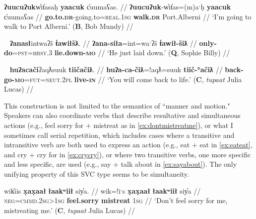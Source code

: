 \ex \label{ex:walktoalberni}
\begingl
\glpreamble \textbf{ʔuucuʔuk}w̓it̓asaḥ \textbf{yaacuk} c̓uumaʕas. //
\gla \textbf{ʔuucuʔuk}-w̓it̓as=(m)aˑḥ \textbf{yaacuk} c̓uumaʕas //
\glb \textbf{go.to.\textsc{dr}}-going.to=\textsc{real.1sg} \textbf{walk.\textsc{dr}} Port.Alberni //
\glft `I'm going to walk to Port Alberni.' (\textbf{B}, Bob Mundy) //
\endgl
\xe

\ex~ \label{ex:justliedown}
\begingl
\glpreamble \textbf{ʔanasł}intwaʔš \textbf{t̓awiłšƛ}. //
\gla \textbf{ʔana-siła}=int=waˑʔš \textbf{t̓awił-šiƛ} //
\glb \textbf{only-do}=\textsc{pst}=\textsc{hrsy.3} \textbf{lie.down-\textsc{mo}} //
\glft `He just laid down.' (\textbf{Q}, Sophie Billy) //
\endgl
\xe

\begin{comment}
\ex~ \label{ex:goaheadwent}
\begingl
\glpreamble nay̓iiʔak̓aƛin \textbf{kuw̓iła} \textbf{wałaak}. //
\gla nay̓iiʔak=!aƛ=(m)in \textbf{kuw̓iła} \textbf{wałaak} //
\glb immediately=\textsc{now}=\textsc{real.1pl} \textbf{go.ahead} \textbf{go.to.\textsc{mo}} //
\glft `We immediately went ahead and went.' (\textbf{B}, Marjorie Touchie) //
\endgl
\xe
\end{comment}

\ex~ \label{ex:comebacktolife}
\begingl
\glpreamble \textbf{huʔacači}ʔaqƛsuuk \textbf{tiičačiƛ}. //
\gla \textbf{huʔa-ca-čiƛ}=!aqƛ=suuk \textbf{tiič-°ačiƛ} //
\glb \textbf{back-go-\textsc{mo}}=\textsc{fut}=\textsc{neut.2pl} \textbf{live-\textsc{in}} //
\glft `You will come back to life.' (\textbf{C}, \textit{tupaat} Julia Lucas) //
\endgl
\xe

This construction is not limited to the semantics of ``manner and motion." Speakers can also coordinate verbs that describe resultative and simultaneous actions (e.g., feel sorry for + mistreat as in \ref{ex:dontmistreatme}), or what I sometimes call serial repetition, which includes cases where a transitive and intransitive verb are both used to express an action (e.g., eat + eat in \ref{ex:eateat}, and cry + cry for in \ref{ex:crycry}), or where two transitive verbs, one more specific and less specific, are used (e.g., say + talk about in \ref{ex:sayabout}). The only unifying property of this SVC type seems to be simultaneity.

\ex \label{ex:dontmistreatme}
\begingl
\glpreamble wik̓iis \textbf{x̣ax̣aał} \textbf{łaakʷiił} siy̓a. //
\gla wik=!iˑs \textbf{x̣ax̣aał} \textbf{łaakʷiił} siy̓a //
\glb \textsc{neg}=\textsc{cmmd.2sg>1sg} \textbf{feel.sorry} \textbf{mistreat} \textsc{1sg} //
\glft `Don't feel sorry for me, mistreating me.' (\textbf{C}, \textit{tupaat} Julia Lucas) //
\endgl
\xe

